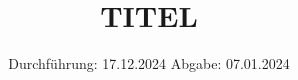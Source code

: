 

\subject{V351}
\title{TITEL}
\date{%
  Durchführung: 17.12.2024
  \hspace{3em}
  Abgabe: 07.01.2024
}



\maketitle
\thispagestyle{empty}
\tableofcontents
\newpage






\printbibliography{}


